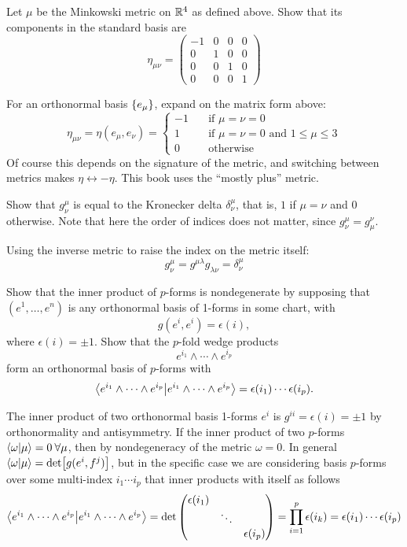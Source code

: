 \documentclass[10pt]{article}
\begin{document}
\begin{example}
	Let $\mu$ be the Minkowski metric on $\mathbb{R}^4$ as defined above. Show that its components in the standard basis are
	$$
		\eta_{\mu\nu} = \begin{pmatrix}
			-1&0&0&0\\0&1&0&0\\0&0&1&0\\0&0&0&1
		\end{pmatrix}
	$$
\end{example}
\sol For an orthonormal basis $\lbrace e_\mu\rbrace$, expand on the matrix form above:
$$
\eta_{\mu\nu} = \eta(e_\mu,e_\nu) = \begin{cases}
	-1& \quad\text{if $\mu=\nu=0$}\\
	1&  \quad\text{if $\mu=\nu=0$ and $1 \le \mu \le 3$}\\
	0&  \quad\text{otherwise}
\end{cases}
$$
Of course this depends on the signature of the metric, and switching between metrics makes $\eta \leftrightarrow -\eta$. This book uses the ``mostly plus'' metric.


\begin{example}
	Show that $g^\mu_\nu$ is equal to the Kronecker delta $\delta^\mu_\nu$, that is, $1$ if $\mu=\nu$ and $0$ otherwise. Note that here the order of indices does not matter, since $g^\mu_\nu = g^\nu_\mu$.
\end{example}
\sol Using the inverse metric to raise the index on the metric itself:
$$
g^\mu_\nu = g^{\mu\lambda} g_{\lambda\nu} = \delta^\mu_\nu
$$


\begin{example}\label{b1e57}
	Show that the inner product of $p$-forms is nondegenerate by supposing that $(e^1,\dots,e^n)$ is any orthonormal basis of 1-forms in some chart, with
	$$
		g(e^i,e^i) = \epsilon(i),
	$$
	where $\epsilon(i) = \pm 1$. Show that the $p$-fold wedge products
	$$
		e^{i_1} \wedge \cdots \wedge e^{i_p}
	$$
	form an orthonormal basis of $p$-forms with
	$$
		\ip{e^{i_1} \wedge \cdots \wedge e^{i_p}} = \epsilon(i_1)\cdots \epsilon(i_p).
	$$
\end{example}
\sol The inner product of two orthonormal basis 1-forms $e^i$ is $g^{ii} = \epsilon(i) = \pm 1$ by orthonormality and antisymmetry. If the inner product of two $p$-forms $\ip{\omega}{\mu} = 0\: \forall \mu$, then by nondegeneracy of the metric $\omega = 0$. In general $\ip{\omega}{\mu} = \det[g(e^i,f^j)]$, but in the specific case we are considering basis $p$-forms over some multi-index $i_1 \cdots i_p$ that inner products with itself as follows
$$
\ip{e^{i_1} \wedge \cdots \wedge e^{i_p}} = \det\begin{pmatrix}
	\epsilon(i_1)&&\\
	&\ddots&\\
	&&\epsilon(i_p)
\end{pmatrix} = \prod_{i=1}^{p} \epsilon(i_k) = \epsilon(i_1)\cdots \epsilon(i_p)
$$
\end{document}
